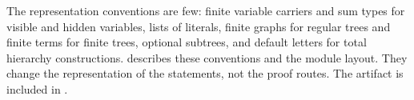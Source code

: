 The representation conventions are few: finite variable carriers and sum
types for visible and hidden variables, lists of literals, finite graphs for
regular trees and finite terms for finite trees, optional subtrees, and
default letters for total hierarchy constructions.  describes
these conventions and the module layout. They change the representation of
the statements, not the proof routes. The artifact is included in
.
